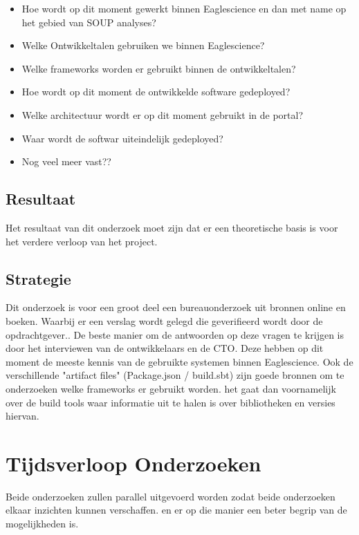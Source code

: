 \begin{itemize}
  \item Hoe wordt op dit moment gewerkt binnen Eaglescience en dan met name op het gebied van SOUP analyses?
  \item Welke Ontwikkeltalen gebruiken we binnen Eaglescience?
  \item Welke frameworks worden er gebruikt binnen de ontwikkeltalen?
  \item Hoe wordt op dit moment de ontwikkelde software gedeployed?
  \item Welke architectuur wordt er op dit moment gebruikt in de portal?
  \item Waar wordt de softwar uiteindelijk gedeployed?
  \item Nog veel meer vast??
\end{itemize}

\subsection{Resultaat}%
Het resultaat van dit onderzoek moet zijn dat er een theoretische basis is voor het verdere verloop van het project.
\subsection{Strategie}
Dit onderzoek is voor een groot deel een bureauonderzoek uit bronnen online en boeken. Waarbij er een verslag wordt gelegd die geverifieerd wordt door de opdrachtgever..
De beste manier om de antwoorden op deze vragen te krijgen is door het interviewen van de ontwikkelaars en de CTO. Deze hebben op dit moment de meeste kennis van de gebruikte systemen binnen Eaglescience. Ook de verschillende "artifact files" (Package.json / build.sbt) zijn goede bronnen om te onderzoeken welke frameworks er gebruikt worden. het gaat dan voornamelijk over de build tools waar informatie uit te halen is over bibliotheken en versies hiervan.

\section{Tijdsverloop Onderzoeken}
Beide onderzoeken zullen parallel uitgevoerd worden zodat beide onderzoeken elkaar inzichten kunnen verschaffen. en er op die manier een beter begrip van de mogelijkheden is.
